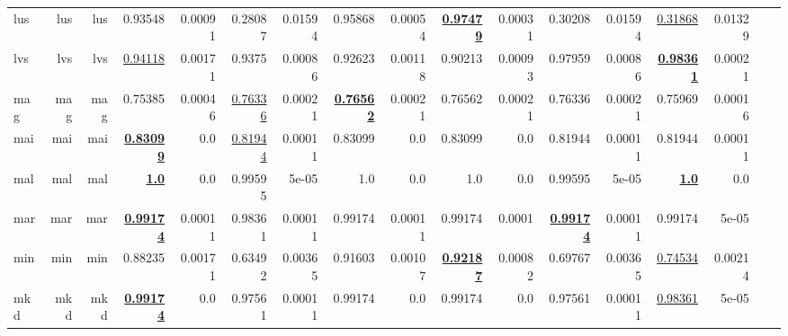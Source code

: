 \documentclass[11pt]{article}
\begin{document}
\begin{table*}[h]
{\begin{tabular}{lrrrrrrrrrrrrrrrr}
lus         & lus         & lus         & 0.93548         & 0.00091         & 0.28087         & 0.01594         & 0.95868         & 0.00054         & \textbf{\underline{0.97479}}         & 0.00031         & 0.30208         & 0.01594         & \underline{0.31868}         & 0.01329         \\
lvs         & lvs         & lvs         & \underline{0.94118}         & 0.00171         & 0.9375         & 0.00086         & 0.92623         & 0.00118         & 0.90213         & 0.00093         & 0.97959         & 0.00086         & \textbf{\underline{0.98361}}         & 0.00021         \\
mag         & mag         & mag         & 0.75385         & 0.00046         & \underline{0.76336}         & 0.00021         & \textbf{\underline{0.76562}}         & 0.00021         & 0.76562         & 0.00021         & 0.76336         & 0.00021         & 0.75969         & 0.00016         \\
mai         & mai         & mai         & \textbf{\underline{0.83099}}         & 0.0         & \underline{0.81944}         & 0.00011         & 0.83099         & 0.0         & 0.83099         & 0.0         & 0.81944         & 0.00011         & 0.81944         & 0.00011         \\
mal         & mal         & mal         & \textbf{\underline{1.0}}         & 0.0         & 0.99595         & 5e-05         & 1.0         & 0.0         & 1.0         & 0.0         & 0.99595         & 5e-05         & \textbf{\underline{1.0}}         & 0.0         \\
mar         & mar         & mar         & \textbf{\underline{0.99174}}         & 0.00011         & 0.98361         & 0.00011         & 0.99174         & 0.00011         & 0.99174         & 0.0001         & \textbf{\underline{0.99174}}         & 0.00011         & 0.99174         & 5e-05         \\
min         & min         & min         & 0.88235         & 0.00171         & 0.63492         & 0.00365         & 0.91603         & 0.00107         & \textbf{\underline{0.92187}}         & 0.00082         & 0.69767         & 0.00365         & \underline{0.74534}         & 0.00214         \\
mkd         & mkd         & mkd         & \textbf{\underline{0.99174}}         & 0.0         & 0.97561         & 0.00011         & 0.99174         & 0.0         & 0.99174         & 0.0         & 0.97561         & 0.00011         & \underline{0.98361}         & 5e-05         \\

\end{tabular}}
\end{table*}
\end{document}
